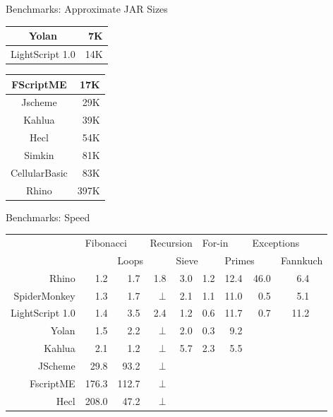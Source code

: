 \documentclass[a4paper,landscape]{slides}
\begin{document}
\begin{slide}
	{\large 
            Benchmarks: Approximate JAR Sizes
	\\ \mbox{}}
        \begin{center}
        \begin{tabular}{|c|r|} \hline
        Yolan & 7K \\ \hline
        LightScript 1.0 & 14K \\ \hline
        \end{tabular}
        \begin{tabular}{|c|r|} \hline
        FScriptME & 17K \\ \hline
        Jscheme & 29K \\ \hline
        Kahlua & 39K \\ \hline
        Hecl & 54K \\ \hline
        Simkin & 81K \\ \hline
        CellularBasic & 83K \\ \hline
        Rhino & 397K \\ \hline
        \end{tabular}
        \end{center}
\end{slide}

\begin{slide}
	{\large 
            Benchmarks: Speed
	\\ \mbox{}}
\addtolength{\hoffset}{-260pt}
        \begin{center} \begin{tabular}{|r|r|r|r|r|r|r|r|rr|} \hline
        & \multicolumn{2}{|l|}{Fibonacci} & \multicolumn{2}{|l|}{Recursion} & \multicolumn{2}{|l|}{For-in} & \multicolumn{2}{|l}{Exceptions} & \\
        & & \multicolumn{2}{|l|}{Loops} & \multicolumn{2}{|l|}{Sieve} & \multicolumn{2}{|l|}{Primes} & \multicolumn{2}{|l|}{Fannkuch} \\
        \hline Rhino       & 1.2 & 1.7 & 1.8   & 3.0 & 1.2 & 12.4 & 46.0 & 6.4 & \\
        \hline SpiderMonkey& 1.3 & 1.7 & $\bot$ & 2.1 & 1.1 & 11.0 & 0.5  & 5.1 & \\
        \hline LightScript 1.0 & 1.4 & 3.5 & 2.4   & 1.2 & 0.6 & 11.7 & 0.7  & 11.2 & \\
        \hline Yolan       & 1.5 & 2.2 & $\bot$ & 2.0 & 0.3 &  9.2 &  &  & \\
        \hline Kahlua      & 2.1 & 1.2 & $\bot$ &  5.7 & 2.3 & 5.5 &  &  & \\
        \hline JScheme    & 29.8 & 93.2 & $\bot$ & & & & & & \\
        \hline FscriptME & 176.3 & 112.7& $\bot$ & & & & & & \\
        \hline Hecl      & 208.0 & 47.2 & $\bot$ & & & & & & \\
        \hline \end{tabular}
        \end{center}
\addtolength{\hoffset}{260pt}
\end{slide}
\end{document}
